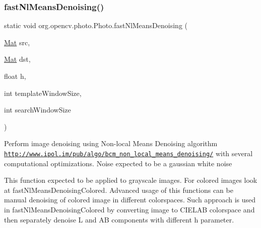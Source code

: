 \subsubsection{\texorpdfstring{fast\+Nl\+Means\+Denoising()}{fastNlMeansDenoising()}\hspace{0.1cm}{\footnotesize\ttfamily [1/2]}}
{\footnotesize\ttfamily static void org.\+opencv.\+photo.\+Photo.\+fast\+Nl\+Means\+Denoising (\begin{DoxyParamCaption}\item[{\mbox{\hyperlink{classorg_1_1opencv_1_1core_1_1_mat}{Mat}}}]{src,  }\item[{\mbox{\hyperlink{classorg_1_1opencv_1_1core_1_1_mat}{Mat}}}]{dst,  }\item[{float}]{h,  }\item[{int}]{template\+Window\+Size,  }\item[{int}]{search\+Window\+Size }\end{DoxyParamCaption})\hspace{0.3cm}{\ttfamily [static]}}

Perform image denoising using Non-\/local Means Denoising algorithm \href{http://www.ipol.im/pub/algo/bcm_non_local_means_denoising/}{\tt http\+://www.\+ipol.\+im/pub/algo/bcm\+\_\+non\+\_\+local\+\_\+means\+\_\+denoising/} with several computational optimizations. Noise expected to be a gaussian white noise

This function expected to be applied to grayscale images. For colored images look at {\ttfamily fast\+Nl\+Means\+Denoising\+Colored}. Advanced usage of this functions can be manual denoising of colored image in different colorspaces. Such approach is used in {\ttfamily fast\+Nl\+Means\+Denoising\+Colored} by converting image to C\+I\+E\+L\+AB colorspace and then separately denoise L and AB components with different h parameter.


